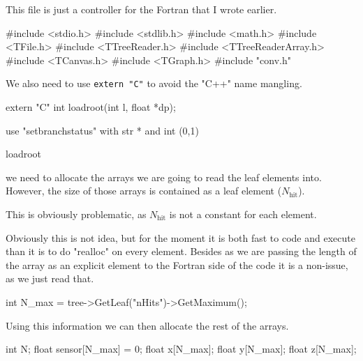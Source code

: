 \documentclass[10pt, a4paper]{article}
\begin{document}
This file is just a controller for the Fortran that I wrote earlier. 

\begin{code}
#include <stdio.h>
#include <stdlib.h>
#include <math.h>
#include <TFile.h>
#include <TTreeReader.h>
#include <TTreeReaderArray.h>
#include <TCanvas.h>
#include <TGraph.h>
#include "conv.h"
\end{code}
We also need to use \verb|extern "C"| to avoid the "C++" name mangling.

\begin{code}
extern "C" {
	int loadroot(int l, float *dp);
}
\end{code}

use "setbranchstatus" with str * and int (0,1)

\begin{codeblock}{loadroot}
\begin{code}
int loadroot(int l, float *dp) {
// 	TFile file("../ns~Bender-5000ev-20190701.root");
	TFile file("../ns~real.root");
	TTree *tree = (TTree *) file.Get("RICH/OfflineMonopoleFinderR1Gas/OfflineMonopoleFinderR1Gas");
// 	TTree *tree = (TTree *) file.Get("tuple/tuple");
	tree->SetBranchStatus("*", 0);
	tree->SetBranchStatus("nHits", 1);
// 	tree->SetBranchStatus("HitRICH", 1);
	tree->SetBranchStatus("HitPosX", 1);
	tree->SetBranchStatus("HitPosY", 1);
	tree->SetBranchStatus("HitPosZ", 1);
// 	tree->SetBranchStatus("Generated_PE", 1);
// 	tree->SetBranchStatus("Generated_PX", 1);
// 	tree->SetBranchStatus("Generated_PY", 1);
// 	tree->SetBranchStatus("Generated_PZ", 1);
\end{code}
we need to allocate the arrays we are going to read the leaf elements into. 
However, the size of those arrays is contained as a leaf element ($N_\text{hit}$). 

This is obviously problematic, as $N_\text{hit}$ is not a constant for each element. 

Obviously this is not idea, but for the moment it is both fast to code and execute than it is to do "realloc" on every element. 
Besides as we are passing the length of the array as an explicit element to the Fortran side of the code it is a non-issue, as we just read that. 

\begin{code}
	int N_max = tree->GetLeaf("nHits")->GetMaximum();
\end{code}

Using this information we can then allocate the rest of the arrays. 

\begin{code}
	int N;
	float sensor[N_max] = {0};
	float x[N_max];
	float y[N_max];
	float z[N_max];
	

\end{code}
\end{codeblock}
\end{document}

